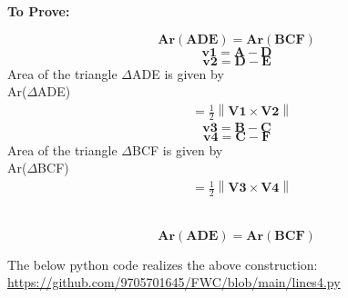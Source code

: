 \documentclass[10pt,a4paper]{report}
\let\vec\mathbf
\providecommand{\norm}[1]{\left\lVert#1\right\rVert}
\let\vec\mathbf
\begin{document}
\begin{multicols}{2}
\textbf{To Prove:} 
  \begin{center}
  \begin{equation}
      \vec{Ar(ADE)=Ar(BCF)}
  \end{equation}
  \begin{equation}
      \vec{v1=A-D}
      \end{equation}
      \begin{equation}
      \vec{v2=D-E}
 \end{equation}
 \vspace{3mm}
 Area of the triangle $\Delta$ADE is given by \\
 Ar($\Delta$ADE) 
\begin{align} 
 &= \frac{1}{2}\norm{\vec{V1}\times\vec{V2}}
\end{align}
 \begin{equation}
      \vec{v3=B-C}
 \end{equation}
 \begin{equation}
    \vec{v4=C-F}
 \end{equation}
 \vspace{3mm}
  Area of the triangle $\Delta$BCF is given by \\
  Ar($\Delta$BCF)
   \begin{align}
 & =\frac{1}{2}\norm{\vec{V3}\times\vec{V4}}
\end{align}\\
 \end{center}
 \begin{center}
\begin{equation}
    \vec{Ar(ADE)=Ar(BCF)}
\end{equation}
\end{center}
The below python code realizes the above construction: \\
\url{https://github.com/9705701645/FWC/blob/main/lines4.py}

\end{multicols}
\end{document}
